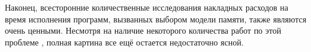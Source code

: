 Наконец, всесторонние количественные исследования 
накладных расходов на время исполнения программ, 
вызванных выбором модели памяти, также являются очень ценными. 
Несмотря на наличие некоторого количества работ по этой проблеме%
\cite{Singh-al:ISCA12, Liu-al:OOPSLA17, Liu-al:PLDI19, 
Vollmer-al:PPoPP17, Dolan-al:PLDI18, Ou-Demsky:OOPSLA18}, 
полная картина все ещё остается недостаточно ясной. 